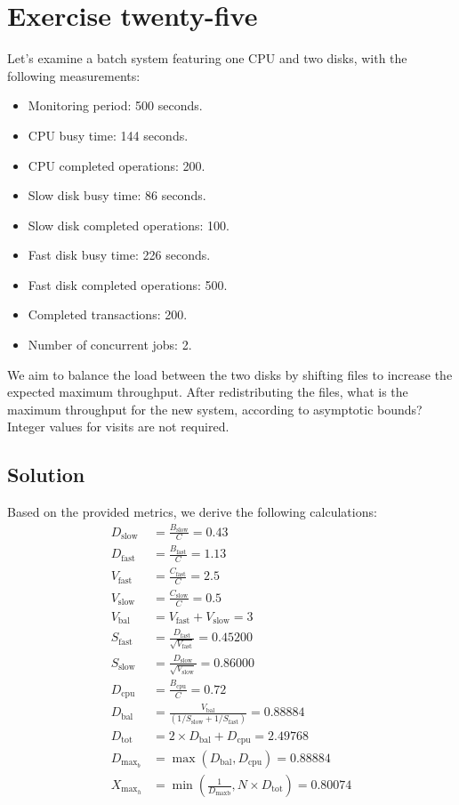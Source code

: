 \section{Exercise twenty-five}

Let's examine a batch system featuring one CPU and two disks, with the following measurements:
\begin{itemize}
    \item Monitoring period: 500 seconds.
    \item CPU busy time: 144 seconds.
    \item CPU completed operations: 200.
    \item Slow disk busy time: 86 seconds.
    \item Slow disk completed operations: 100.
    \item Fast disk busy time: 226 seconds.
    \item Fast disk completed operations: 500.
    \item Completed transactions: 200.
    \item Number of concurrent jobs: 2.
\end{itemize}
We aim to balance the load between the two disks by shifting files to increase the expected maximum throughput. 
After redistributing the files, what is the maximum throughput for the new system, according to asymptotic bounds? Integer values for visits are not required.

\subsection*{Solution}
Based on the provided metrics, we derive the following calculations:
\begin{align*}
    D_{\text{slow}} & = \frac{B_{\text{slow}}}{C} = 0.43 \\
    D_{\text{fast}} & = \frac{B_{\text{fast}}}{C} = 1.13 \\
    V_{\text{fast}} & = \frac{C_{\text{fast}}}{C} = 2.5 \\
    V_{\text{slow}} & = \frac{C_{\text{slow}}}{C} = 0.5 \\
    V_{\text{bal}} & = V_{\text{fast}} + V_{\text{slow}} = 3 \\
    S_{\text{fast}} & = \frac{D_{\text{fast}}}{\sqrt{V_{\text{fast}}}} = 0.45200 \\
    S_{\text{slow}} & = \frac{D_{\text{slow}}}{\sqrt{V_{\text{slow}}}} = 0.86000 \\
    D_{\text{cpu}} & = \frac{B_{\text{cpu}}}{C} = 0.72 \\
    D_{\text{bal}} & = \frac{V_{\text{bal}}}{(1/S_{\text{slow}} + 1/S_{\text{fast}})} = 0.88884 \\
    D_{\text{tot}} & = 2 \times D_{\text{bal}} + D_{\text{cpu}} = 2.49768 \\
    D_{\text{max}_b} & = \max\left(D_{\text{bal}}, D_{\text{cpu}}\right) = 0.88884 \\
    X_{\text{max}_h} & = \min\left(\frac{1}{D_{\text{maxb}}}, N \times D_{\text{tot}}\right) = 0.80074
\end{align*}